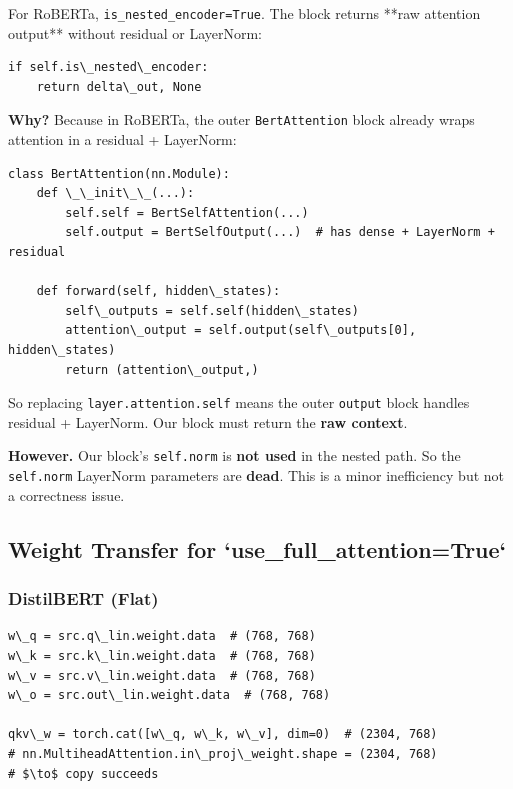 For RoBERTa, \texttt{is\_nested\_encoder=True}. The block returns **raw attention 
output** without residual or LayerNorm:

\begin{lstlisting}
if self.is\_nested\_encoder:
    return delta\_out, None
\end{lstlisting}

\textbf{Why?} Because in RoBERTa, the outer \texttt{BertAttention} block already wraps 
attention in a residual + LayerNorm:

\begin{lstlisting}
class BertAttention(nn.Module):
    def \_\_init\_\_(...):
        self.self = BertSelfAttention(...)
        self.output = BertSelfOutput(...)  # has dense + LayerNorm + residual
    
    def forward(self, hidden\_states):
        self\_outputs = self.self(hidden\_states)
        attention\_output = self.output(self\_outputs[0], hidden\_states)
        return (attention\_output,)
\end{lstlisting}

So replacing \texttt{layer.attention.self} means the outer \texttt{output} block handles 
residual + LayerNorm. Our block must return the \textbf{raw context}.

\textbf{However.} Our block's \texttt{self.norm} is \textbf{not used} in the nested path. So 
the \texttt{self.norm} LayerNorm parameters are \textbf{dead}. This is a minor 
inefficiency but not a correctness issue.

\subsection{Weight Transfer for `use\_full\_attention=True`}

\subsubsection{DistilBERT (Flat)}

\begin{lstlisting}
w\_q = src.q\_lin.weight.data  # (768, 768)
w\_k = src.k\_lin.weight.data  # (768, 768)
w\_v = src.v\_lin.weight.data  # (768, 768)
w\_o = src.out\_lin.weight.data  # (768, 768)

qkv\_w = torch.cat([w\_q, w\_k, w\_v], dim=0)  # (2304, 768)
# nn.MultiheadAttention.in\_proj\_weight.shape = (2304, 768)
# $\to$ copy succeeds
\end{lstlisting}

